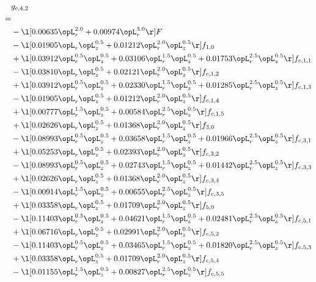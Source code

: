 \begin{alignat}{2} 
\label{eq:g_42_0} 
& g_{c,4,2} \nonumber \\ 
 = \\ 
& - \l[  0.00635 \opL_r^{2.0} +  0.00974 \opL_r^{3.0}  \r] F \nonumber \\ 
& - \l[  0.01905 \opL_r \opL_z^{0.5} +  0.01212 \opL_r^{2.0} \opL_z^{0.5}  \r] f_{1,0} \nonumber \\ 
& + \l[  0.03912 \opL_r^{0.5} \opL_z^{0.5} +  0.03106 \opL_r^{1.5} \opL_z^{0.5} +  0.01753 \opL_r^{2.5} \opL_z^{0.5}  \r] f_{c,1,1} \nonumber \\ 
& - \l[  0.03810 \opL_r \opL_z^{0.5} +  0.02121 \opL_r^{2.0} \opL_z^{0.5}  \r] f_{c,1,2} \nonumber \\ 
& + \l[  0.03912 \opL_r^{0.5} \opL_z^{0.5} +  0.02330 \opL_r^{1.5} \opL_z^{0.5} +  0.01285 \opL_r^{2.5} \opL_z^{0.5}  \r] f_{c,1,3} \nonumber \\ 
& - \l[  0.01905 \opL_r \opL_z^{0.5} +  0.01212 \opL_r^{2.0} \opL_z^{0.5}  \r] f_{c,1,4} \nonumber \\ 
& + \l[  0.00777 \opL_r^{1.5} \opL_z^{0.5} +  0.00584 \opL_r^{2.5} \opL_z^{0.5}  \r] f_{c,1,5} \nonumber \\ 
& + \l[  0.02626 \opL_r \opL_z^{0.5} +  0.01368 \opL_r^{2.0} \opL_z^{0.5}  \r] f_{3,0} \nonumber \\ 
& - \l[  0.08993 \opL_r^{0.5} \opL_z^{0.5} +  0.03658 \opL_r^{1.5} \opL_z^{0.5} +  0.01966 \opL_r^{2.5} \opL_z^{0.5}  \r] f_{c,3,1} \nonumber \\ 
& + \l[  0.05253 \opL_r \opL_z^{0.5} +  0.02393 \opL_r^{2.0} \opL_z^{0.5}  \r] f_{c,3,2} \nonumber \\ 
& - \l[  0.08993 \opL_r^{0.5} \opL_z^{0.5} +  0.02743 \opL_r^{1.5} \opL_z^{0.5} +  0.01442 \opL_r^{2.5} \opL_z^{0.5}  \r] f_{c,3,3} \nonumber \\ 
& + \l[  0.02626 \opL_r \opL_z^{0.5} +  0.01368 \opL_r^{2.0} \opL_z^{0.5}  \r] f_{c,3,4} \nonumber \\ 
& - \l[  0.00914 \opL_r^{1.5} \opL_z^{0.5} +  0.00655 \opL_r^{2.5} \opL_z^{0.5}  \r] f_{c,3,5} \nonumber \\ 
& + \l[  0.03358 \opL_r \opL_z^{0.5} +  0.01709 \opL_r^{2.0} \opL_z^{0.5}  \r] f_{5,0} \nonumber \\ 
& - \l[  0.11403 \opL_r^{0.5} \opL_z^{0.5} +  0.04621 \opL_r^{1.5} \opL_z^{0.5} +  0.02481 \opL_r^{2.5} \opL_z^{0.5}  \r] f_{c,5,1} \nonumber \\ 
& + \l[  0.06716 \opL_r \opL_z^{0.5} +  0.02991 \opL_r^{2.0} \opL_z^{0.5}  \r] f_{c,5,2} \nonumber \\ 
& - \l[  0.11403 \opL_r^{0.5} \opL_z^{0.5} +  0.03465 \opL_r^{1.5} \opL_z^{0.5} +  0.01820 \opL_r^{2.5} \opL_z^{0.5}  \r] f_{c,5,3} \nonumber \\ 
& + \l[  0.03358 \opL_r \opL_z^{0.5} +  0.01709 \opL_r^{2.0} \opL_z^{0.5}  \r] f_{c,5,4} \nonumber \\ 
& - \l[  0.01155 \opL_r^{1.5} \opL_z^{0.5} +  0.00827 \opL_r^{2.5} \opL_z^{0.5}  \r] f_{c,5,5} \nonumber \\ 
\end{alignat} 


